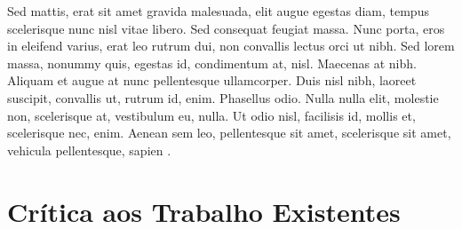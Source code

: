 Sed mattis, erat sit amet gravida malesuada, elit augue egestas diam,
tempus scelerisque nunc nisl vitae libero. Sed consequat feugiat massa. Nunc
porta, eros in eleifend varius, erat leo rutrum dui, non convallis lectus orci
ut nibh. Sed lorem massa, nonummy quis, egestas id, condimentum at, nisl.
Maecenas at nibh. Aliquam et augue at nunc pellentesque ullamcorper. Duis
nisl nibh, laoreet suscipit, convallis ut, rutrum id, enim. Phasellus odio. Nulla
nulla elit, molestie non, scelerisque at, vestibulum eu, nulla. Ut odio nisl,
facilisis id, mollis et, scelerisque nec, enim. Aenean sem leo, pellentesque sit
amet, scelerisque sit amet, vehicula pellentesque, sapien \cite{anderson1989}.

\lipsum[40]


\section{Crítica aos Trabalho Existentes}
\label{sec:Crítica-aos-Trabalho-Existentes}

\lipsum[25-29]
